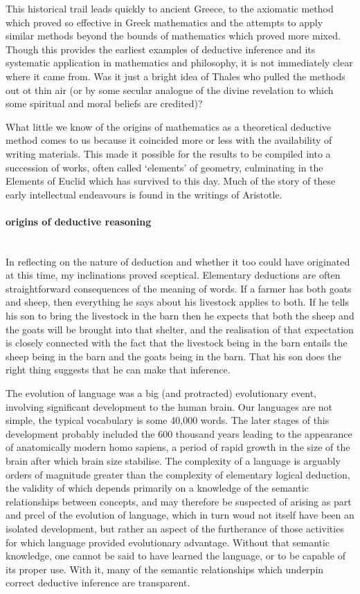 \documentclass[10pt,titlepage]{book}
\begin{document}
This historical trail leads quickly to ancient Greece, to the axiomatic method which proved so effective in Greek mathematics and the attempts to apply similar methods beyond the bounds of mathematics which proved more mixed.
Though this provides the earliest examples of deductive inference and its systematic application in mathematics and philosophy, it is not immediately clear where it came from.
Was it just a bright idea of Thales who pulled the methods out ot thin air (or by some secular analogue of the divine revelation to which some spiritual and moral beliefs are credited)?

What little we know of the origins of mathematics as a theoretical deductive method comes to us because it coincided more or less with the availability of writing materials.
This made it possible for the results to be compiled into a succession of works, often called `elements' of geometry, culminating in the Elements of Euclid which has survived to this day.
Much of the story of these early intellectual endeavours is found in the writings of Aristotle.

\paragraph{origins of deductive reasoning}~\\

In reflecting on the nature of deduction and whether it too could have originated at this time, my inclinations proved sceptical.
Elementary deductions are often straightforward consequences of the meaning of words.
If a farmer has both goats and sheep, then everything he says about his livestock applies to both.
If he tells his son to bring the livestock in the barn then he expects that both the sheep and the goats will be brought into that shelter, and the realisation of that expectation is closely connected with the fact that the livestock being in the barn entails the sheep being in the barn and the goats being in the barn.
That his son does the right thing suggests that he can make that inference.

The evolution of language was a big (and protracted) evolutionary event, involving significant development to the human brain.
Our languages are not simple, the typical vocabulary is some 40,000 words.
The later stages of this development probably included the 600 thousand years leading to the appearance of anatomically modern homo sapiens, a period of rapid growth in the size of the brain after which brain size stabilise.
The complexity of a language is arguably orders of magnitude greater than the complexity of elementary logical deduction, the validity of which depends primarily on a knowledge of the semantic relationships between concepts, and may therefore be suspected of arising as part and prcel of the evolution of language, which in turn woud not itself have been an isolated development, but rather an aspect of the furtherance of those activities for which language provided evolutionary advantage.
Without that semantic knowledge, one cannot be said to have learned the language, or to be capable of its proper use.
With it, many of the semantic relationships which underpin correct deductive inference are transparent.
\end{document}
